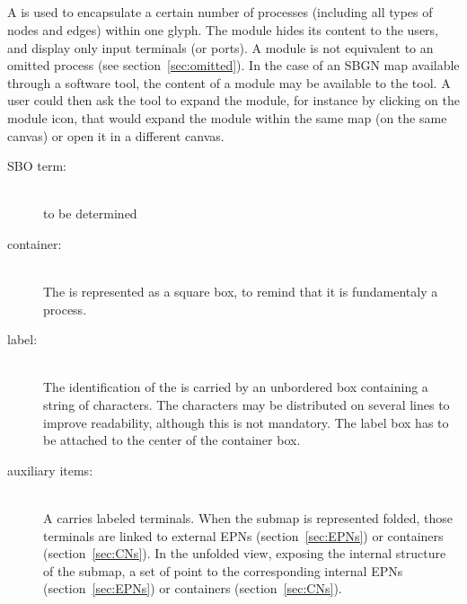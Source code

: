 \color{green}
\subsection{}\label{sec:submap}

A  is used to encapsulate a certain number of processes (including all types of nodes and edges) within one glyph. The module hides its content to the users, and display only input terminals (or ports). A module is not equivalent to an omitted process (see section~\ref{sec:omitted}). In the case of an SBGN map available through a software tool, the content of a module may be available to the tool. A user could then ask the tool to expand the module, for instance by clicking on the module icon, that would expand the module within the same map (on the same canvas) or open it in a different canvas.

\begin{description}
\item[SBO term:]\mbox{}\\ to be determined
\item[container:]\mbox{}\\ The  is represented as a square box, to remind that it is fundamentaly a process.
\item[label:] \mbox{}\\ The identification of the  is carried by an unbordered box containing a string of
  characters. The characters may be distributed on several lines to improve readability, although this is not mandatory.  The label box has to be attached to the center of the container box.
\item[auxiliary items:]\mbox{}\\ A  carries labeled terminals. When the submap is represented folded, those terminals are linked to external EPNs (section~\ref{sec:EPNs}) or containers (section~\ref{sec:CNs}). In the unfolded view, exposing the internal structure of the submap, a set of  point to the corresponding internal EPNs (section~\ref{sec:EPNs}) or containers (section~\ref{sec:CNs}).
\end{description}

